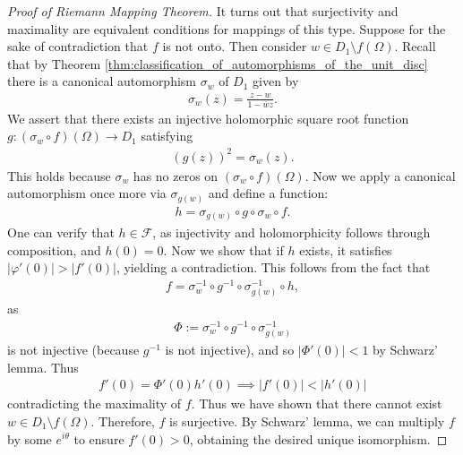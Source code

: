 \documentclass{memoir}
\begin{document}
\begin{proof}[Proof of Riemann Mapping Theorem]
	It turns out that surjectivity and maximality are equivalent conditions for mappings of this type. Suppose for the sake of contradiction that \(f\) is not onto. Then consider \(w \in D_1\setminus f(\Omega )\). Recall that by Theorem \ref{thm:classification_of_automorphisms_of_the_unit_disc} there is a canonical automorphism \(\sigma_w\) of \(D_1\) given by
	\begin{align*}
		\sigma_w(z) = \frac{z-w}{1-\overline{w}z}.
	\end{align*}
	We assert that there exists an injective holomorphic square root function \(g:(\sigma_w\circ f)(\Omega) \to D_1\) satisfying
	\begin{align*}
		(g(z))^2 = \sigma_w(z).
	\end{align*}
	This holds because \(\sigma_w\) has no zeros on \((\sigma_w \circ f)(\Omega) \). Now we apply a canonical automorphism once more via \(\sigma_{g(w)}\) and define a function:
	\begin{align*}
		h = \sigma_{g(w)}\circ g \circ \sigma_w \circ f.
	\end{align*}
	One can verify that \(h \in \mathcal{F}\), as injectivity and holomorphicity follows through composition, and \(h(0) = 0\). Now we show that if \(h \) exists, it satisfies \(\left| \varphi'(0) \right| > \left| f'(0) \right| \), yielding a contradiction. This follows from the fact that
	\begin{align*}
		f = \sigma^{-1}_w \circ g^{-1} \circ \sigma^{-1}_{g(w)} \circ h,
	\end{align*}
	as
	\begin{align*}
		\Phi := \sigma^{-1}_w \circ g^{-1} \circ \sigma^{-1}_{g(w)}
	\end{align*}
	is not injective (because \(g^{-1}\) is not injective), and so \(\left| \Phi'(0) \right| <1\) by Schwarz' lemma. Thus
	\begin{align*}
		f'(0) = \Phi'(0) h'(0) \implies \left| f'(0) \right| < \left| h'(0) \right| 
	\end{align*}
	contradicting the maximality of \(f\). Thus we have shown that there cannot exist \(w \in D_1\setminus f(\Omega )\). Therefore, \(f\) is surjective. By Schwarz' lemma, we can multiply \(f\) by some \(e^{i\theta }\) to ensure \(f'(0) > 0\), obtaining the desired unique isomorphism.
\end{proof}

\end{document}
